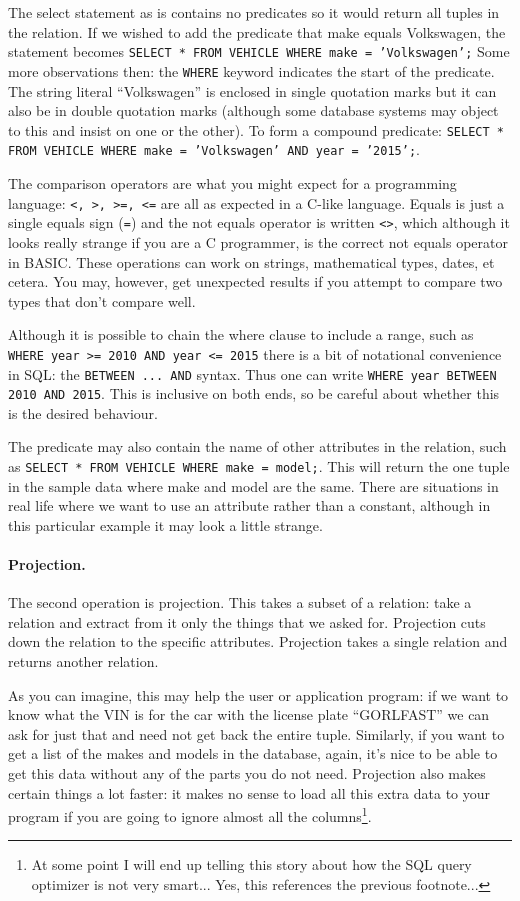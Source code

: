 The select statement as is contains no predicates so it would return all tuples in the relation. If we wished to add the predicate that make equals Volkswagen, the statement becomes \texttt{SELECT * FROM VEHICLE WHERE make = 'Volkswagen';} Some more observations then: the \texttt{WHERE} keyword indicates the start of the predicate. The string literal ``Volkswagen'' is enclosed in single quotation marks but it can also be in double quotation marks (although some database systems may object to this and insist on one or the other). To form a compound predicate: \texttt{SELECT * FROM VEHICLE WHERE make = 'Volkswagen' AND year = '2015';}. 

The comparison operators are what you might expect for a programming language: \texttt{<, >, >=, <=} are all as expected in a C-like language. Equals is just a single equals sign (\texttt{=}) and the not equals operator is written \texttt{<>}, which although it looks really strange if you are a C programmer, is the correct not equals operator in BASIC. These operations can work on strings, mathematical types, dates, et cetera. You may, however, get unexpected results if you attempt to compare two types that don't compare well.

Although it is possible to chain the where clause to include a range, such as \texttt{WHERE year >= 2010 AND year <= 2015} there is a bit of notational convenience in SQL: the \texttt{BETWEEN ... AND} syntax. Thus one can write \texttt{WHERE year BETWEEN 2010 AND 2015}. This is inclusive on both ends, so be careful about whether this is the desired behaviour. 

The predicate may also contain the name of other attributes in the relation, such as \texttt{SELECT * FROM VEHICLE WHERE make = model;}. This will return the one tuple in the sample data where make and model are the same. There are situations in real life where we want to use an attribute rather than a constant, although in this particular example it may look a little strange.

\paragraph{Projection.} The second operation is projection. This takes a subset of a relation: take a relation and extract from it only the things that we asked for. Projection cuts down the relation to the specific attributes. Projection takes a single relation and returns another relation.

As you can imagine, this may help the user or application program: if we want to know what the VIN is for the car with the license plate ``GORLFAST'' we can ask for just that and need not get back the entire tuple. Similarly, if you want to get a list of the makes and models in the database, again, it's nice to be able to get this data without any of the parts you do not need. Projection also makes certain things a lot faster: it makes no sense to load all this extra data to your program if you are going to ignore almost all the columns\footnote{At some point I will end up telling this story about how the SQL query optimizer is not very smart... Yes, this references the previous footnote...}.

